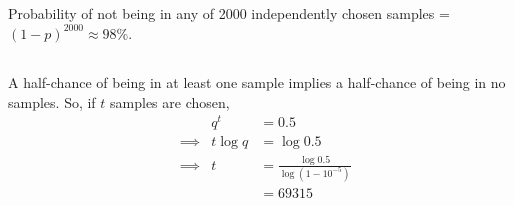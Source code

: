 \documentclass[twocolumn]{article}
\begin{document}
\subsection{} Probability of not being in any of 2000 independently chosen samples = $(1-p)^{2000} \approx 98\%$.
\subsection{} A half-chance of being in at least one sample implies a half-chance of being in no samples. So, if $t$ samples are chosen, \begin{align*}
&				& q^t		&= 0.5\\
&\implies & t \log q&=\log 0.5 \\
&\implies & t			&=\frac{\log 0.5}{\log(1-10^{-5})}\\
&&&=69315
\end{align*}
\end{document}
